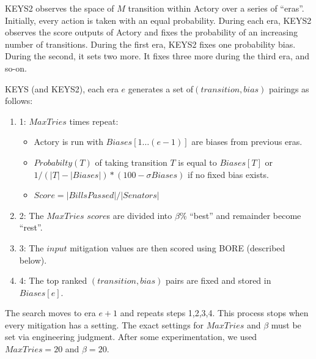 \documentclass{sig-alternate}
\newcounter{over}
\newenvironment{smallitem}
 {\setlength{\topsep}{0pt}
  \setlength{\partopsep}{0pt}
  \setlength{\parskip}{0pt}
  \begin{itemize}
   \setlength{\leftmargin}{.2in}
  \setlength{\parsep}{0pt}
  \setlength{\parskip}{0pt}
  \setlength{\itemsep}{0pt}}
 {\end{itemize}}
\newenvironment{smallenum}
 {\setlength{\topsep}{0pt}
  \setlength{\partopsep}{0pt}
  \setlength{\parskip}{0pt}
  \begin{enumerate}
  \setlength{\leftmargin}{.2in}
  \setlength{\parsep}{0pt}
  \setlength{\parskip}{0pt}
  \setlength{\itemsep}{0pt}}
 {\end{enumerate}}
\newcommand{\bi}{\begin{smallitem}}
\newcommand{\ei}{\end{smallitem}}
\newcommand{\be}{\begin{smallenum}}
\newcommand{\ee}{\end{smallenum}}
\begin{document}
KEYS2 observes the space of $M$ transition within Actory
over a series of ``eras''. 
Initially, every action is taken with an equal probability. 
During each era, KEYS2 observes the score outputs of Actory and 
fixes the probability of an increasing number of transitions. During 
the first era, KEYS2 fixes one probability bias. During the second, it
sets two more. It fixes three more during the third era, and so-on. 

KEYS (and KEYS2), each era $e$ generates
a set of\newline $(transition, bias)$ pairings as follows:
\be
\item[1:]
$MaxTries$ times repeat:
\bi
\item Actory is run with $Biases[1{\ldots}(e-1)]$ are biases from previous eras.
\item
	$Probabilty(T)$ of taking transition $T$ is equal to 
$Biases[T]$ or $1/(|T|-|Biases|) * (100- \sigma Biases)$ if no fixed
bias exists. 
\item
	$Score = |Bills Passed|/|Senators|$
\ei
\item[2:] The $MaxTries$ $score$s are divided into $\beta$\% ``best'' 
and remainder become ``rest''. 
\item[3:]
The $input$ mitigation values are then scored using BORE
(described below).
\item[4:]
The top ranked $(transition,bias)$ pairs are fixed and stored in $Biases[e]$.\ee
The search moves to era $e+1$ and repeats steps 1,2,3,4.
This process stops 
when every mitigation has a setting.  
The exact settings for $MaxTries$ and $\beta$ must be set via engineering judgment.
After some experimentation, we used $MaxTries=20$ and $\beta=20$.
\end{document}
